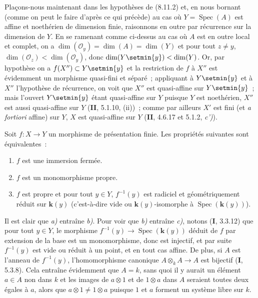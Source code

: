 Plaçons-nous maintenant dans les hypothèses de (8.11.2) et, en nous bornant
(comme on peut le faire d'après ce qui précède) au cas où
$Y=\operatorname{Spec}(A)$ est affine et noethérien de dimension finie,
raisonnons en outre par récurrence sur la dimension de $Y$. En se ramenant
comme ci-dessus au cas où $A$ est en outre local et complet, on a
$\dim(\mathcal O_y)=\dim(A)=\dim(Y)$ et pour tout $z\neq y$,
$\dim(\mathcal O_z)<\dim(\mathcal O_y)$, donc
$\dim(Y\setmin\{y\})<\dim(Y)$. Or, par hypothèse on a
$f(X'')\subset Y\setmin\{y\}$ et la restriction de $f$ à $X''$ est évidemment un
morphisme quasi-fini et séparé~; appliquant à $Y\setmin\{y\}$ et à $X''$
l'hypothèse de récurrence, on voit que $X''$ est quasi-affine sur
$Y\setmin\{y\}$~; mais l'ouvert $Y\setmin\{y\}$ étant quasi-affine sur $Y$ puisque $Y$ est
noethérien, $X''$ est aussi quasi-affine sur $Y$ (\textbf{II}, 5.1.10, (ii))~; comme
par ailleurs $X'$ est fini (et \emph{a fortiori} affine) sur $Y$, $X$ est
quasi-affine sur $Y$ (\textbf{II}, 4.6.17 et 5.1.2, \emph{c')}).

\begin{proposition}[8.11.5]
\label{IV.8.11.5-fr}
Soit $f:X\to Y$ un morphisme de présentation finie. Les propriétés suivantes
sont équivalentes~:
\begin{enumerate}
\item[\emph{a)}] $f$ est une immersion fermée.
\item[\emph{b)}] $f$ est un monomorphisme propre.
\item[\emph{c)}] $f$ est propre et pour tout $y\in Y$, $f^{-1}(y)$ est
radiciel et géométriquement réduit sur $\boldsymbol{k}(y)$ (c'est-à-dire vide ou
$\boldsymbol{k}(y)$-isomorphe à $\operatorname{Spec}(\boldsymbol{k}(y))$).
\end{enumerate}
\end{proposition}

Il est clair que \emph{a)} entraîne \emph{b)}. Pour voir que \emph{b)}
entraîne \emph{c)}, notons (\textbf{I}, 3.3.12) que pour tout $y\in Y$, le morphisme
$f^{-1}(y)\to\operatorname{Spec}(\boldsymbol{k}(y))$ déduit de $f$ par extension de la base
est un monomorphisme, donc est injectif, et par suite $f^{-1}(y)$ est vide ou
réduit à un point, et en tout cas affine. De plus, si $A$ est l'anneau de
$f^{-1}(y)$, l'homomorphisme canonique $A\otimes_kA\to A$ est bijectif
(\textbf{I}, 5.3.8). Cela entraîne évidemment que $A=k$, sans quoi il y aurait un
élément $a\in A$ non dans $k$ et les images de $a\otimes1$ et de $1\otimes a$
dans $A$ seraient toutes deux égales à $a$, alors que $a\otimes1\neq1\otimes a$
puisque $1$ et $a$ forment un système libre sur $k$.

